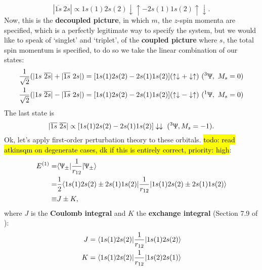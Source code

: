 \begin{equation}
|\overline{1s}\ 2s|\propto1s(1)2s(2)\downarrow\uparrow-2s(1)1s(2)\uparrow\downarrow.
\end{equation}
Now, this is the \textbf{decoupled picture}, in which $m$, the $z$-spin momenta 
are specified, which is a perfectly legitimate way to specify the system, but we 
would like to speak of `singlet' and `triplet', \ie of the \textbf{coupled 
picture} where $s$, the total spin momentum is specified, to do so we take the 
linear combination of our states:
\begin{equation}
\begin{aligned}
&\frac{1}{\sqrt{2}}(|1s\ \overline{2s}|+|\overline{1s}\ 2s|)=[1s(1)2s(2)-2s(1)1s(2)](\uparrow\downarrow+\downarrow\uparrow)\ (^3\ups,\ M_s=0) \\
&\frac{1}{\sqrt{2}}(|1s\ \overline{2s}|-|\overline{1s}\ 2s|)=[1s(1)2s(2)-2s(1)1s(2)](\uparrow\downarrow-\downarrow\uparrow)\ (^1\ups,\ M_s=0)
\end{aligned}
\end{equation}
The last state is
\begin{equation}
|\overline{1s}\ \overline{2s}|\propto[1s(1)2s(2)-2s(1)1s(2)]\downarrow\downarrow\ (^3\ups, M_s=-1).
\end{equation}
Ok, let's apply first-order perturbation theory to these orbitals. \hl{todo: read atkinsqm on degenerate cases, dk if this is entirely correct, priority: high}:
\begin{equation}
\begin{aligned}
E^{(1)}=&\langle \Uppsi_{\pm}|\frac{1}{r_{12}}|\Uppsi_{\pm}\rangle\\
=&\frac{1}{2}\langle1s(1)2s(2)\pm2s(1)1s(2)|\frac{1}{r_{12}}|1s(1)2s(2)\pm2s(1)1s(2)\rangle\\
\equiv&J\pm K, 
\end{aligned}
\end{equation}
where $J$ is the \textbf{Coulomb integral} and $K$ the \textbf{exchange integral} 
(Section 7.9 of \cite{atkinsqm}):
\begin{equation}
\begin{aligned}
J&=\langle 1s(1)2s(2)|\frac{1}{r_{12}}|1s(1)2s(2)\rangle\\
K&=\langle 1s(1)2s(2)|\frac{1}{r_{12}}|1s(2)2s(1)\rangle
\end{aligned}
\end{equation}

